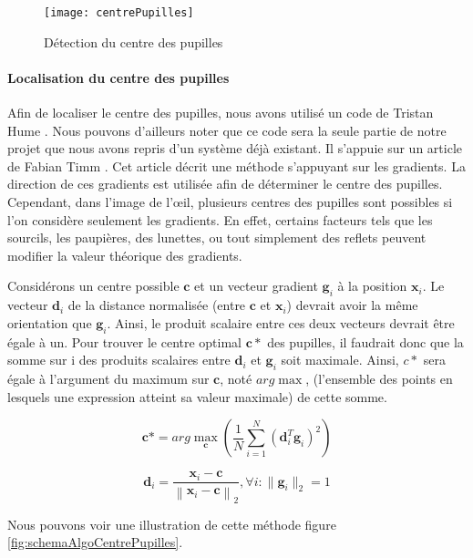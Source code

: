 \begin{figure}[H]
  \centering
  \texttt{[image: centrePupilles]}
  \caption{Détection du centre des pupilles}
  \label{fig:centrePupilles}
\end{figure}

\paragraph{Localisation du centre des pupilles}

Afin de localiser le centre des pupilles, nous avons utilisé un code de Tristan Hume \cite{eyelike}. Nous pouvons d'ailleurs noter que ce code sera la seule partie de notre projet que nous avons repris d'un système déjà existant. Il s’appuie sur un article de Fabian Timm \cite{timm2011accurate}. Cet article décrit une méthode s’appuyant sur les gradients. La direction de ces gradients est utilisée afin de déterminer le centre des pupilles. Cependant, dans l’image de l’œil, plusieurs centres des pupilles sont possibles si l’on considère seulement les gradients. En effet, certains facteurs tels que les sourcils, les paupières, des lunettes, ou tout simplement des reflets peuvent modifier la valeur théorique des gradients.

Considérons un centre possible $\mathbf{c}$ et un vecteur gradient $\mathbf{g}_i$ à la position $\mathbf{x}_i$. Le vecteur $\mathbf{d}_i$ de la distance normalisée (entre $\mathbf{c}$ et $\mathbf{x}_i$) devrait avoir la même orientation que $\mathbf{g}_i$. Ainsi, le produit scalaire entre ces deux vecteurs devrait être égale à un. Pour trouver le centre optimal $\mathbf{c}*$ des pupilles, il faudrait donc que la somme sur i des produits scalaires entre $\mathbf{d}_i$ et $\mathbf{g}_i$ soit maximale. Ainsi, $c*$ sera égale à l'argument du maximum sur $\mathbf{c}$, noté $arg \max$, (l'ensemble des points en lesquels une expression atteint sa valeur maximale) de cette somme.

\begin{equation}
\mathbf{c}* = arg\max_{\mathbf{c}}\left (\frac{1}{N}\sum_{i=1}^N(\mathbf{d}_i^T\mathbf{g}_i)^2\right )
\label{eq:1}
\end{equation}

\begin{equation}
\mathbf{d}_i = \frac{\mathbf{x}_i - \mathbf{c}}{\left \| \mathbf{x}_i - \mathbf{c} \right \|_2} , \forall i : \|\mathbf{g}_i\|_2 = 1
\label{eq:2}
\end{equation}

Nous pouvons voir une illustration de cette méthode figure \ref{fig:schemaAlgoCentrePupilles}.

